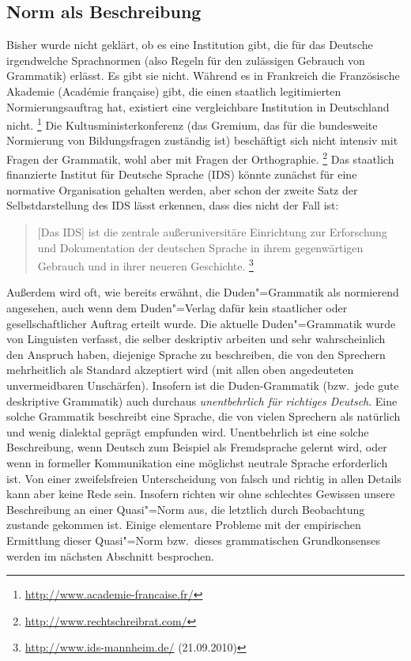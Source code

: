 \subsection{Norm als Beschreibung}

\label{sec:normalsbeschreibung}

Bisher wurde nicht geklärt, ob es eine Institution gibt, die für das Deutsche irgendwelche Sprachnormen (also Regeln für den zulässigen Gebrauch von Grammatik) erlässt.
Es gibt sie nicht.
Während es \zB in Frankreich die Französische Akademie (Académie française) gibt, die einen staatlich legitimierten Normierungsauftrag hat, existiert eine vergleichbare Institution in Deutschland nicht.%
\footnote{\raggedright{\url{http://www.academie-francaise.fr/}}}
Die Kultusministerkonferenz (das Gremium, das für die bundesweite Normierung von Bildungsfragen zuständig ist) beschäftigt sich nicht intensiv mit Fragen der Grammatik, wohl aber mit Fragen der Orthographie.%
\footnote{\url{http://www.rechtschreibrat.com/}}
Das staatlich finanzierte Institut für Deutsche Sprache (IDS) könnte zunächst für eine normative Organisation gehalten werden, aber schon der zweite Satz der Selbstdarstellung des IDS lässt erkennen, dass dies nicht der Fall ist:

\begin{quote}
  [Das IDS] ist die zentrale außeruniversitäre Einrichtung zur Erforschung und Dokumentation der deutschen Sprache in ihrem gegenwärtigen Gebrauch und in ihrer neueren Geschichte.%
    \footnote{\raggedright{\url{http://www.ids-mannheim.de/} (21.09.2010)}}
\end{quote}

Außerdem wird oft, wie bereits erwähnt, die Duden"=Grammatik als normierend angesehen, auch wenn dem Duden"=Verlag dafür kein staatlicher oder gesellschaftlicher Auftrag erteilt wurde.
Die aktuelle Duden"=Grammatik wurde von Linguisten verfasst, die selber deskriptiv arbeiten und sehr wahrscheinlich den Anspruch haben, diejenige Sprache zu beschreiben, die von den Sprechern mehrheitlich als Standard akzeptiert wird (mit allen oben angedeuteten unvermeidbaren Unschärfen).
Insofern ist die Duden-Grammatik (bzw.\ jede gute deskriptive Grammatik) auch durchaus \textit{unentbehrlich für richtiges Deutsch}.
Eine solche Grammatik beschreibt eine Sprache, die von vielen Sprechern als natürlich und wenig dialektal geprägt empfunden wird.
Unentbehrlich ist eine solche Beschreibung, wenn Deutsch zum Beispiel als Fremdsprache gelernt wird, oder wenn in formeller Kommunikation eine möglichst neutrale Sprache erforderlich ist.
Von einer zweifelsfreien Unterscheidung von falsch und richtig in allen Details kann aber keine Rede sein.
Insofern richten wir ohne schlechtes Gewissen unsere Beschreibung an einer Quasi"=Norm aus, die letztlich durch Beobachtung zustande gekommen ist.
Einige elementare Probleme mit der empirischen Ermittlung dieser Quasi"=Norm bzw.\ dieses grammatischen Grundkonsenses werden im nächsten Abschnitt besprochen.

